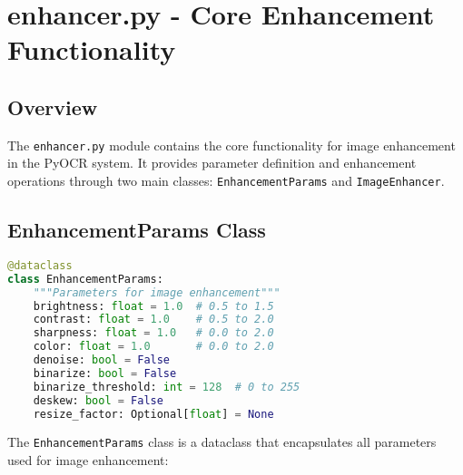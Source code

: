 \section{enhancer.py - Core Enhancement Functionality}

\subsection{Overview}
The \texttt{enhancer.py} module contains the core functionality for image enhancement in the PyOCR system. It provides parameter definition and enhancement operations through two main classes: \texttt{EnhancementParams} and \texttt{ImageEnhancer}.

\subsection{EnhancementParams Class}
\begin{lstlisting}[language=Python, caption=EnhancementParams Class Definition]
@dataclass
class EnhancementParams:
    """Parameters for image enhancement"""
    brightness: float = 1.0  # 0.5 to 1.5
    contrast: float = 1.0    # 0.5 to 2.0
    sharpness: float = 1.0   # 0.0 to 2.0
    color: float = 1.0       # 0.0 to 2.0
    denoise: bool = False
    binarize: bool = False
    binarize_threshold: int = 128  # 0 to 255
    deskew: bool = False
    resize_factor: Optional[float] = None
\end{lstlisting}

The \texttt{EnhancementParams} class is a dataclass that encapsulates all parameters used for image enhancement:

